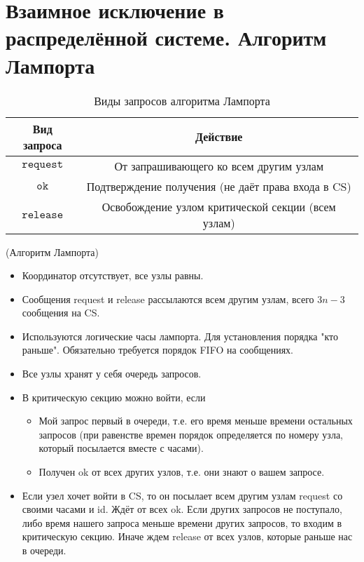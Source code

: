 \section{Взаимное исключение в распределённой системе. Алгоритм Лампорта}

\begin{table}[!ht]
    \centering
    \begin{tabular}{|c|c|} \hline
        Вид запроса & Действие \\ \hline
        $\texttt{request}$ & От запрашивающего ко всем другим узлам\\ \hline
        $\texttt{ok}$ & Подтверждение получения (не даёт права входа в CS) \\ \hline
        $\texttt{release}$ & Освобождение узлом критической секции (всем узлам) \\\hline
    \end{tabular}
    \caption{Виды запросов алгоритма Лампорта}
\end{table}

\begin{algorithm}(Алгоритм Лампорта)
\begin{itemize}
    \item Координатор отсутствует, все узлы равны.
    \item Сообщения request и release рассылаются всем другим узлам, всего $3n-3$ сообщения на CS.
    \item Используются логические часы лампорта.
        Для установления порядка "кто раньше".
        Обязательно требуется порядок FIFO на сообщениях.
    \item Все узлы хранят у себя очередь запросов.
    \item В критическую секцию можно войти, если
        \begin{itemize}
            \item Мой запрос первый в очереди, т.е. его время меньше времени 
                остальных запросов (при равенстве времен порядок определяется 
                по номеру узла, который посылается вместе с часами).
            \item Получен ok от всех других узлов, т.е. они знают о вашем запросе.
        \end{itemize}
    \item Если узел хочет войти в CS, то он посылает всем другим узлам request со
        своими часами и id. Ждёт от всех ok. Если других запросов не поступало, 
        либо время нашего запроса меньше времени других запросов, то
        входим в критическую секцию. Иначе ждем release от всех узлов,
        которые раньше нас в очереди.
\end{itemize}
\end{algorithm}

